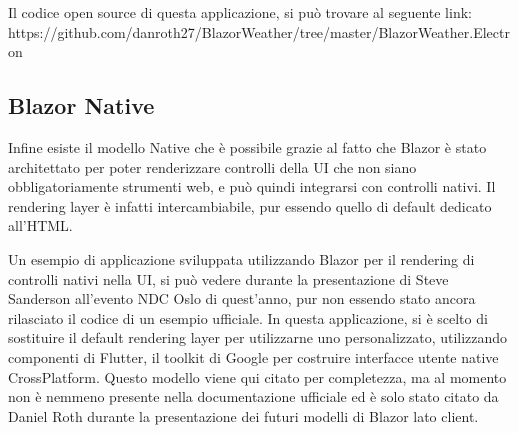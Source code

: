Il codice open source di questa applicazione, si pu\`o trovare al seguente link: https://github.com/danroth27/BlazorWeather/tree/master/BlazorWeather.Electron
\pagebreak

\subsection{Blazor Native}\label{sez:bnative}
Infine esiste il modello Native che \`e possibile grazie al fatto che Blazor \`e stato architettato per poter renderizzare controlli della UI che non siano obbligatoriamente strumenti web, e pu\`o quindi integrarsi con controlli nativi.
Il rendering layer \`e infatti intercambiabile, pur essendo quello di default dedicato all'HTML.

Un esempio di applicazione sviluppata utilizzando Blazor per il rendering di controlli nativi nella UI, si pu\`o vedere durante la presentazione di Steve Sanderson all'evento NDC Oslo di quest'anno, pur non essendo stato ancora rilasciato il codice di un esempio ufficiale.\cite{sandersonNDCBlutter}
In questa applicazione, si \`e scelto di sostituire il default rendering layer per utilizzarne uno personalizzato, utilizzando componenti di Flutter, il toolkit di Google per costruire interfacce utente native CrossPlatform.
Questo modello viene qui citato per completezza, ma al momento non \`e nemmeno presente nella documentazione ufficiale ed \`e solo stato citato da Daniel Roth durante la presentazione dei futuri modelli di Blazor lato client.\cite{blazorNative}


